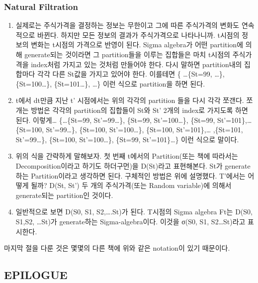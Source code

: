 \documentclass[
]{book}
\providecommand{\tightlist}{%
  \setlength{\itemsep}{0pt}\setlength{\parskip}{0pt}}
\begin{document}
{{{\hypertarget{natural-filtration}{%
\subsubsection{Natural Filtration}\label{natural-filtration}}

\begin{enumerate}
\def\labelenumi{\arabic{enumi}.}
\tightlist
\item
  실제로는 주식가격을 결정하는 정보는 무한이고 그에 따른 주식가격의 변화도 연속적으로 바뀐다. 하지만 모든 정보의 결과가 주식가격으로 나타나니까. t시점의 정보의 변화는 t시점의 가격으로 반영이 된다. Sigma algebra가 어떤 partition에 의해 generate되는 것이라면 그 partition들을 이루는 집합들은 마치 t시점의 주식가격을 index처럼 가지고 있는 것처럼 만들어야 한다. 다시 말하면 partition내의 집합마다 각각 다른 St값을 가지고 있어야 한다. 이를테면 \{ \ldots\{St=99, \ldots\}, \{St=100\ldots\}, \{St=101\ldots\}, \ldots\} 이런 식으로 partition을 하면 된다.
\item
  t에서 dt만큼 지난 t' 시점에서는 위의 각각의 partition 들을 다시 각각 쪼갠다. 쪼개는 방법은 각각의 partition의 집합들이 St와 St' 2개의 index로 가지도록 하면 된다. 이렇게\ldots{} \{\ldots\{St=99, St'=99\ldots\}, \{St=99, St'=100\ldots\}, \{St=99, St'=101\},\ldots{} \{St=100, St'=99\ldots\}, \{St=100, St'=100\ldots\}, \{St=100, St'=101\},\ldots{} ,\{St=101, St'=99\ldots\}, \{St=100, St'=100\ldots\}, \{St=99, St'=101\}\ldots\} 이런 식으로 말이다.
\item
  위의 식을 간략하게 말해보자. 첫 번째 t에서의 Partition(또는 책에 따라서는 Decomposition이라고 하기도 하더구먼)을 D(St)라고 표현해본다. St가 generate 하는 Partition이라고 생각하면 된다. 구체적인 방법은 위에 설명했다. T'에서는 어떻게 될까? D(St, St') 두 개의 주식가격(또는 Random variable)에 의해서 generate되는 partition인 것이다.
\item
  일반적으로 보면 D(S0, S1, S2,\ldots.St)가 된다. T시점의 Sigma algebra Ft는 D(S0, S1,S2, \ldots St)가 generate하는 Sigma-algebra이다. 이것을 σ(S0, S1, S2\ldots St)라고 표시한다.
\end{enumerate}

마지막 절을 다룬 것은 몇몇의 다른 책에 위와 같은 notation이 있기 때문이다.

\hypertarget{epilogue}{%
\subsection{EPILOGUE}\label{epilogue}}

}}}
\end{document}
